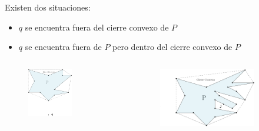 \documentclass[aspectratio=169,xcolor=dvipsnames, t]{beamer}
\begin{document}

\begin{frame}
    Existen dos situaciones:
    \begin{itemize}
        \item $q$ se encuentra fuera del cierre convexo de  $P$
        \item $q$ se encuentra fuera de $P$ pero dentro del cierre convexo de $P$
    \end{itemize}
    \begin{columns}
      \begin{column}{0.45\textwidth}
        \begin{figure}
          \centering
          \includegraphics[width=0.6\textwidth]{imagenes/2.3adiap.png}
        \end{figure}
      \end{column}
      \begin{column}{0.45\textwidth}  %
        \begin{figure}
          \centering
          \includegraphics[width=0.8\textwidth]{imagenes/2.3bdiap.png}
        \end{figure}
      \end{column}
    \end{columns}
\end{frame}
\end{document}
